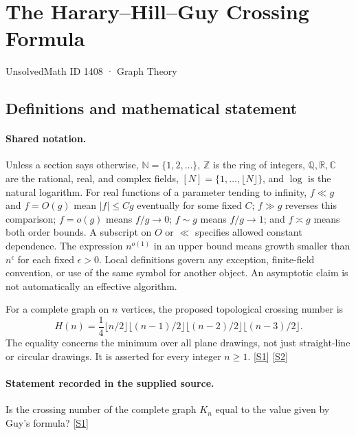 \documentclass[11pt,a4paper]{article}
\newcommand{\N}{\mathbb{N}}
\newcommand{\Z}{\mathbb{Z}}
\newcommand{\Q}{\mathbb{Q}}
\newcommand{\R}{\mathbb{R}}
\newcommand{\C}{\mathbb{C}}
\newcommand{\sref}[2]{\hyperlink{source:#1:#2}{[S#2]}}
\begin{document}

\setcounter{section}{1407}

\section{The Harary--Hill--Guy Crossing Formula}\label{1408}

{\small\sffamily UnsolvedMath ID 1408 · Graph Theory}

\subsection{Definitions and mathematical statement}

\paragraph{Shared notation.}Unless a section says otherwise, $\N=\{1,2,\ldots\}$,
$\Z$ is the ring of integers, $\Q,\R,\C$ are the rational, real, and complex
fields, $[N]=\{1,\ldots,\lfloor N\rfloor\}$, and $\log$ is the natural
logarithm. For real functions of a parameter tending to infinity,
$f\ll g$ and $f=O(g)$ mean $|f|\leq Cg$ eventually for some fixed $C$;
$f\gg g$ reverses this comparison; $f=o(g)$ means $f/g\to0$;
$f\sim g$ means $f/g\to1$; and $f\asymp g$ means both order bounds.
A subscript on $O$ or $\ll$ specifies allowed constant dependence.
The expression $n^{o(1)}$ in an upper bound means growth smaller than
$n^\epsilon$ for each fixed $\epsilon>0$. Local definitions govern any
exception, finite-field convention, or use of the same symbol for another
object. An asymptotic claim is not automatically an effective algorithm.



For a complete graph on $n$ vertices, the proposed topological crossing number is
\[H(n)=\frac14\lfloor n/2\rfloor\lfloor(n-1)/2\rfloor\lfloor(n-2)/2\rfloor\lfloor(n-3)/2\rfloor.\]
The equality concerns the minimum over all plane drawings, not just straight-line or circular drawings. It is asserted for every integer $n\geq1$. \sref{1408}{1} \sref{1408}{2}

\paragraph{Statement recorded in the supplied source.}
Is the crossing number of the complete graph $K_n$ equal to the value given by Guy's formula? \sref{1408}{1}
\end{document}
